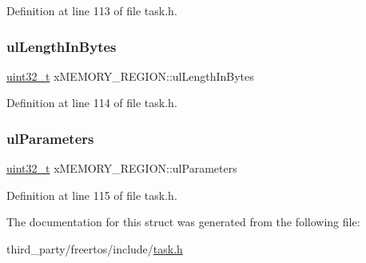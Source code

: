 Definition at line 113 of file task.\+h.

\mbox{\label{structxMEMORY__REGION_a97e59578d3c4c46270d33e7206258a65}} 
\subsubsection{\texorpdfstring{ul\+Length\+In\+Bytes}{ulLengthInBytes}}
{\footnotesize\ttfamily \hyperlink{stdint_8h_a435d1572bf3f880d55459d9805097f62}{uint32\+\_\+t} x\+M\+E\+M\+O\+R\+Y\+\_\+\+R\+E\+G\+I\+O\+N\+::ul\+Length\+In\+Bytes}



Definition at line 114 of file task.\+h.

\mbox{\label{structxMEMORY__REGION_a6ba180553e9a318f23acc5f4664934e3}} 
\subsubsection{\texorpdfstring{ul\+Parameters}{ulParameters}}
{\footnotesize\ttfamily \hyperlink{stdint_8h_a435d1572bf3f880d55459d9805097f62}{uint32\+\_\+t} x\+M\+E\+M\+O\+R\+Y\+\_\+\+R\+E\+G\+I\+O\+N\+::ul\+Parameters}



Definition at line 115 of file task.\+h.



The documentation for this struct was generated from the following file\+:\begin{DoxyCompactItemize}
\item 
third\+\_\+party/freertos/include/\hyperlink{task_8h}{task.\+h}\end{DoxyCompactItemize}
